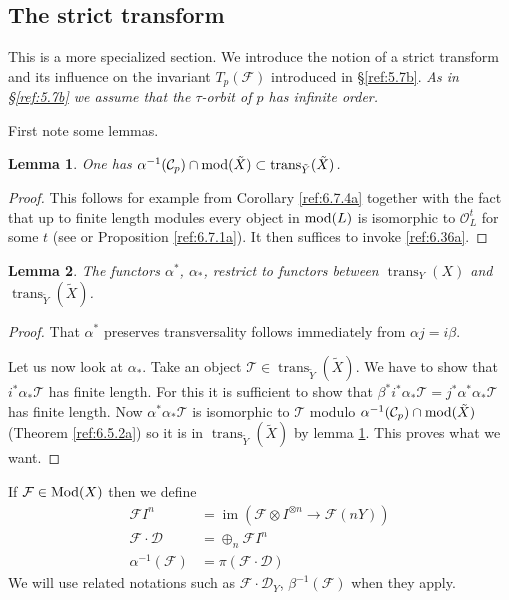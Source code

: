 \documentclass{amsproc}
\def\Cscr{{\mathcal C}}
\def\Dscr{{\mathcal D}}
\def\Fscr{{\mathcal F}}
\def\Oscr{{\mathcal O}}
\def\Tscr{{\mathcal T}}
\def\Mod{\mathop{\text{Mod}}}
\def\mod{\mathop{\text{mod}}}
\def\trans{\operatorname{trans}}
\def\im{\operatorname {im}}
\def\r{\rightarrow}
\let\oldtext\text
\def\text#1{\oldtext{\upshape #1}}
\newtheorem{lemmas}{Lemma}[subsection]
\theoremstyle{definition}
\theoremstyle{remark}
\numberwithin{equation}{section}
\numberwithin{table}{section}
\numberwithin{figure}{section}
\begin{document}
\subsection{The strict transform}
\label{ref:6.8b}
This is a more specialized section. We introduce the notion of a
strict transform and its influence on the invariant $T_p(\Fscr)$
introduced in \S\ref{ref:5.7b}. \emph{As in
\S\ref{ref:5.7b} we assume that the $\tau$-orbit of $p$
has infinite order.}

 First note some lemmas.
\begin{lemmas}
\label{ref:6.8.1a}
  One has $\alpha^{-1}(\Cscr_p)\cap \mod(\tilde{X})\subset
  \trans_{\tilde{Y}}(\tilde{X})$.
\end{lemmas}
\begin{proof}
This follows for example from  Corollary \ref{ref:6.7.4a} together
with the fact that up to finite length modules every object in
$\mod(L)$ is isomorphic to $\Oscr_L^t$ for some $t$ (see
\cite{SmithZhang} or Proposition \ref{ref:6.7.1a}).
It then suffices to invoke \eqref{ref:6.36a}.
\end{proof}
\begin{lemmas}
The functors $\alpha^\ast$, $\alpha_\ast$, restrict to functors
between $\trans_Y(X)$ and $\trans_{\tilde{Y}}(\tilde{X})$. 
\end{lemmas}
\begin{proof}
That $\alpha^\ast$ preserves transversality  follows immediately
from $\alpha j=i\beta$. 

Let us now look at $\alpha_\ast$. Take an object $\Tscr\in
\trans_{\tilde{Y}}(\tilde{X})$. We have to show that
  $i^\ast\alpha_\ast\Tscr$ has finite length. For this it is
  sufficient to show that $\beta^\ast i^\ast\alpha_\ast
  \Tscr=j^\ast\alpha^\ast\alpha_\ast\Tscr$ has finite length. Now
  $\alpha^\ast\alpha_\ast\Tscr$ is isomorphic to $\Tscr$ modulo
  $\alpha^{-1}(\Cscr_p)\cap \mod(\tilde{X})$ (Theorem
  \ref{ref:6.5.2a}) so it is in $\trans_{\tilde{Y}}(\tilde{X})$
    by lemma \ref{ref:6.8.1a}. This proves what we want.
\end{proof}
If $\Fscr\in \Mod(X)$ then we define
\begin{align*}
\Fscr I^n&=\im (\Fscr\otimes I^{\otimes n}\r \Fscr(nY))\\
\Fscr\cdot \Dscr&=\oplus_n \Fscr I^n\\
\alpha^{-1}(\Fscr)&=\pi(\Fscr\cdot \Dscr)
\end{align*}
 We will use related notations such 
as $\Fscr\cdot \Dscr_Y$, $\beta^{-1}(\Fscr)$ when they apply.
\end{document}
